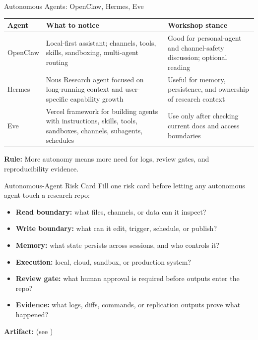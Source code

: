 \begin{frame}{Autonomous Agents: OpenClaw, Hermes, Eve}
  \begin{tabular}{p{}p{}p{}}
    \toprule
    \textbf{Agent} & \textbf{What to notice} & \textbf{Workshop stance} \\
    \midrule
    OpenClaw & Local-first assistant; channels, tools, skills, sandboxing, multi-agent routing & Good for personal-agent and channel-safety discussion; optional reading \\
    Hermes & Nous Research agent focused on long-running context and user-specific capability growth & Useful for memory, persistence, and ownership of research context \\
    Eve & Vercel framework for building agents with instructions, skills, tools, sandboxes, channels, subagents, schedules & Use only after checking current docs and access boundaries \\
    \bottomrule
  \end{tabular}
  \vspace{0.6em}
  {\small\textbf{Rule:} More autonomy means more need for logs, review gates, and reproducibility evidence.}
\end{frame}

\begin{frame}{Autonomous-Agent Risk Card}
  Fill one risk card before letting any autonomous agent touch a research repo:
  \begin{itemize}
    \item \textbf{Read boundary:} what files, channels, or data can it inspect?
    \item \textbf{Write boundary:} what can it edit, trigger, schedule, or publish?
    \item \textbf{Memory:} what state persists across sessions, and who controls it?
    \item \textbf{Execution:} local, cloud, sandbox, or production system?
    \item \textbf{Review gate:} what human approval is required before outputs enter the repo?
    \item \textbf{Evidence:} what logs, diffs, commands, or replication outputs prove what happened?
  \end{itemize}
  \vspace{0.4em}
  \textbf{Artifact:}  {\small (see \ParentCourseUrl)}
\end{frame}

